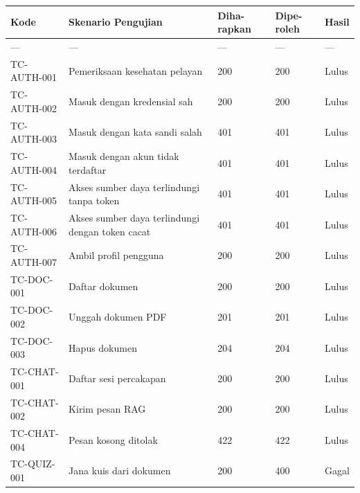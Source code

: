 \documentclass[12pt,a4paper]{article}
\begin{document}
\begin{table}[h]

\centering

\begin{tabular}{lllll}

\toprule

Kode & Skenario Pengujian & Diha-rapkan & Dipe-roleh & Hasil \\

\midrule

--- & --- & --- & --- & --- \\

TC-AUTH-001 & Pemeriksaan kesehatan pelayan & 200 & 200 & Lulus \\

TC-AUTH-002 & Masuk dengan kredensial sah & 200 & 200 & Lulus \\

TC-AUTH-003 & Masuk dengan kata sandi salah & 401 & 401 & Lulus \\

TC-AUTH-004 & Masuk dengan akun tidak terdaftar & 401 & 401 & Lulus \\

TC-AUTH-005 & Akses sumber daya terlindungi tanpa token & 401 & 401 & Lulus \\

TC-AUTH-006 & Akses sumber daya terlindungi dengan token cacat & 401 & 401 & Lulus \\

TC-AUTH-007 & Ambil profil pengguna & 200 & 200 & Lulus \\

TC-DOC-001 & Daftar dokumen & 200 & 200 & Lulus \\

TC-DOC-002 & Unggah dokumen PDF & 201 & 201 & Lulus \\

TC-DOC-003 & Hapus dokumen & 204 & 204 & Lulus \\

TC-CHAT-001 & Daftar sesi percakapan & 200 & 200 & Lulus \\

TC-CHAT-002 & Kirim pesan RAG & 200 & 200 & Lulus \\

TC-CHAT-004 & Pesan kosong ditolak & 422 & 422 & Lulus \\

TC-QUIZ-001 & Jana kuis dari dokumen & 200 & 400 & Gagal \\


\end{tabular}
\end{table}
\end{document}
